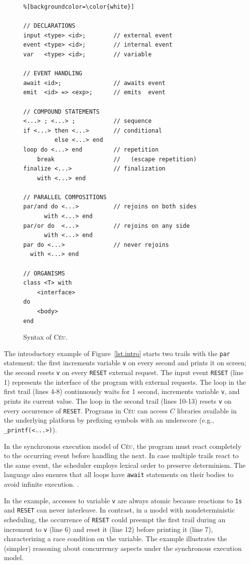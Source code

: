 \documentclass{acm_proc_article-sp}
\newcommand{\CEU}{\textsc{C\'{e}u}\xspace}
\newcommand{\code}[1] {{\small{\texttt{#1}}}}
\newcommand{\1}{\;}
\newcommand{\2}{\;\;}
\newcommand{\3}{\;\;\;}
\newcommand{\5}{\;\;\;\;\;}
\begin{document}
\begin{figure}[t]
\begin{lstlisting}%[backgroundcolor=\color{white}]

// DECLARATIONS
input <type> <id>;        // external event
event <type> <id>;        // internal event
var   <type> <id>;        // variable

// EVENT HANDLING
await <id>;               // awaits event
emit  <id> => <exp>;      // emits  event

// COMPOUND STATEMENTS
<...> ; <...> ;           // sequence
if <...> then <...>       // conditional
         else <...> end
loop do <...> end         // repetition
    break                 //   (escape repetition)
finalize <...>            // finalization
    with <...> end

// PARALLEL COMPOSITIONS
par/and do <...>          // rejoins on both sides
      with <...> end
par/or do  <...>          // rejoins on any side
      with <...> end
par do <...>              // never rejoins
  with <...> end

// ORGANISMS
class <T> with
    <interface>
do
    <body>
end
\end{lstlisting}
\caption{ Syntax of \CEU.
\label{lst.syntax}
}
\end{figure}

The introductory example of Figure~\ref{lst.intro} starts two trails with the 
\code{par} statement: the first increments variable \code{v} on every second 
and prints it on screen; the second resets \code{v} on every \code{RESET} 
external request.
%
The input event \code{RESET} (line 1) represents the interface of the program 
with external requests.
The loop in the first trail (lines 4-8) continuously waits for 1 second, 
increments variable \code{v}, and prints its current value.
The loop in the second trail (lines 10-13) resets \code{v} on every occurrence 
of \code{RESET}.
%
Programs in \CEU can access $C$ libraries available in the underlying platform 
by prefixing symbols with an underscore (e.g., \code{\_printf(<...>)}).

In the synchronous execution model of \CEU, the program must react completely 
to the occurring event before handling the next.
%
In case multiple trails react to the same event, the scheduler employs lexical 
order to preserve determinism.
%
The language also ensures that all loops have \code{await} statements on their 
bodies to avoid infinite execution.
\cite{ceu.sensys13}.

In the example, accesses to variable \code{v} are always atomic because 
reactions to \code{1s} and \code{RESET} can never interleave.
%
In contrast, in a model with nondeterministic scheduling, the occurrence of 
\code{RESET} could preempt the first trail during an increment to \code{v} 
(line 6) and reset it (line 12) before printing it (line 7), characterizing a 
race condition on the variable.
%
The example illustrates the (simpler) reasoning about concurrency aspects under 
the synchronous execution model.
\end{document}
